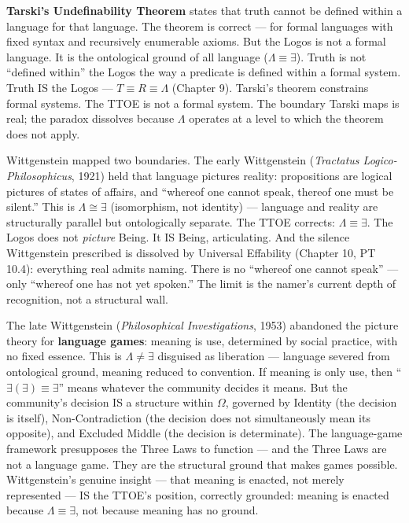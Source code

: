 \documentclass[10pt, openany, oneside]{book}
\begin{document}
\textbf{Tarski's Undefinability Theorem} states that truth cannot be defined within a language for that language. The theorem is correct --- for formal languages with fixed syntax and recursively enumerable axioms. But the Logos is not a formal language. It is the ontological ground of all language ($\Lambda \equiv \exists$). Truth is not ``defined within'' the Logos the way a predicate is defined within a formal system. Truth IS the Logos --- $T \equiv R \equiv \Lambda$ (Chapter 9). Tarski's theorem constrains formal systems. The TTOE is not a formal system. The boundary Tarski maps is real; the paradox dissolves because $\Lambda$ operates at a level to which the theorem does not apply.

Wittgenstein mapped two boundaries. The early Wittgenstein (\textit{Tractatus Logico-Philosophicus}, 1921) held that language pictures reality: propositions are logical pictures of states of affairs, and ``whereof one cannot speak, thereof one must be silent.'' This is $\Lambda \cong \exists$ (isomorphism, not identity) --- language and reality are structurally parallel but ontologically separate. The TTOE corrects: $\Lambda \equiv \exists$. The Logos does not \textit{picture} Being. It IS Being, articulating. And the silence Wittgenstein prescribed is dissolved by Universal Effability (Chapter 10, PT 10.4): everything real admits naming. There is no ``whereof one cannot speak'' --- only ``whereof one has not yet spoken.'' The limit is the namer's current depth of recognition, not a structural wall.

The late Wittgenstein (\textit{Philosophical Investigations}, 1953) abandoned the picture theory for \textbf{language games}: meaning is use, determined by social practice, with no fixed essence. This is $\Lambda \neq \exists$ disguised as liberation --- language severed from ontological ground, meaning reduced to convention. If meaning is only use, then ``$\exists(\exists) \equiv \exists$'' means whatever the community decides it means. But the community's decision IS a structure within $\Omega$, governed by Identity (the decision is itself), Non-Contradiction (the decision does not simultaneously mean its opposite), and Excluded Middle (the decision is determinate). The language-game framework presupposes the Three Laws to function --- and the Three Laws are not a language game. They are the structural ground that makes games possible. Wittgenstein's genuine insight --- that meaning is enacted, not merely represented --- IS the TTOE's position, correctly grounded: meaning is enacted because $\Lambda \equiv \exists$, not because meaning has no ground.
\end{document}
